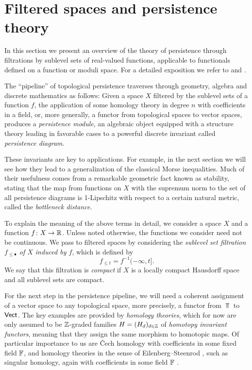 
\section{Filtered spaces and persistence theory} \label{s:persistence}

In this section we present an overview of the theory of persistence through filtrations by sublevel sets of real-valued functions, applicable to functionals defined on a function or moduli space.
For a detailed exposition we refer to \cite{polterovich2020topological} and \cite{Chazal.2016a, MR3408277}.

The ``pipeline'' of topological persistence traverses through geometry, algebra and discrete mathematics as follows:
Given a space $X$ filtered by the sublevel sets of a function $f$, the application of some homology theory in degree $n$ with coefficients in a field,  or, more generally, a functor from topological spaces to vector spaces, produces a \textit{persistence module}, an algebraic object equipped with a structure theory leading in favorable cases to a powerful discrete invariant called \textit{persistence diagram}.

These invariants are key to applications.
For example, in the next section we will see how they lead to a generalization of the classical Morse inequalities.
Much of their usefulness comes from a remarkable geometric fact known as stability, stating that the map from functions on $X$ with the supremum norm to the set of all persistence diagrams is 1-Lipschitz with respect to a certain natural metric, called the \emph{bottleneck distance}.

To explain the meaning of the above terms in detail, we consider a space $X$ and a function $f \colon X \to \mathbb{R}$.
Unless noted otherwise, the functions we consider need not be continuous.
We pass to filtered spaces by considering the \textit{sublevel set filtration $f_{\leq \bullet}$ of $X$ induced by $f$}, which is defined by
\begin{equation*}
f_{\leq t} = f^{-1}(-\infty, t].
\end{equation*}
We say that this filtration is \textit{compact} if $X$ is a locally compact Hausdorff space and all sublevel sets are compact.

For the next step in the persistence pipeline, we will need a coherent assignment of a vector space to any topological space, more precisely, a functor from $\Top$ to $\mathsf{Vect}$.
The key examples are provided by \emph{homology theories}, which for now are only assumed to be $\mathbb{Z}$-graded families $H = (H_d)_{d \in \mathbb{Z}}$ of \emph{homotopy invariant functors}, meaning that they assign the same morphism to homotopic maps.
Of particular importance to us are \v{C}ech homology \cite[Section IX--X]{MR0050886} with coefficients in some fixed field $\mathbb{F}$, and homology theories in the sense of Eilenberg--Steenrod \cite[Section I]{MR0050886}, such as singular homology, again with coefficients in some field $\mathbb{F}$ \cite{Eilenberg.1944}.

